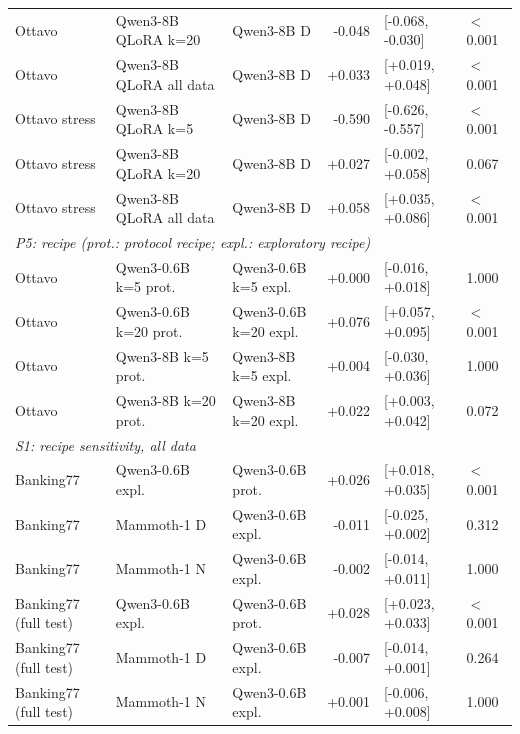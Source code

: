 \begin{tabular}{lllrll}
Ottavo & Qwen3-8B QLoRA k=20 & Qwen3-8B D & -0.048 & [-0.068, -0.030] & $<$0.001 \\
Ottavo & Qwen3-8B QLoRA all data & Qwen3-8B D & +0.033 & [+0.019, +0.048] & $<$0.001 \\
Ottavo stress & Qwen3-8B QLoRA k=5 & Qwen3-8B D & -0.590 & [-0.626, -0.557] & $<$0.001 \\
Ottavo stress & Qwen3-8B QLoRA k=20 & Qwen3-8B D & +0.027 & [-0.002, +0.058] & 0.067 \\
Ottavo stress & Qwen3-8B QLoRA all data & Qwen3-8B D & +0.058 & [+0.035, +0.086] & $<$0.001 \\
\midrule
\multicolumn{6}{l}{\textit{P5: recipe (prot.: protocol recipe; expl.: exploratory recipe)}} \\
Ottavo & Qwen3-0.6B k=5 prot. & Qwen3-0.6B k=5 expl. & +0.000 & [-0.016, +0.018] & 1.000 \\
Ottavo & Qwen3-0.6B k=20 prot. & Qwen3-0.6B k=20 expl. & +0.076 & [+0.057, +0.095] & $<$0.001 \\
Ottavo & Qwen3-8B k=5 prot. & Qwen3-8B k=5 expl. & +0.004 & [-0.030, +0.036] & 1.000 \\
Ottavo & Qwen3-8B k=20 prot. & Qwen3-8B k=20 expl. & +0.022 & [+0.003, +0.042] & 0.072 \\
\midrule
\multicolumn{6}{l}{\textit{S1: recipe sensitivity, all data}} \\
Banking77 & Qwen3-0.6B expl. & Qwen3-0.6B prot. & +0.026 & [+0.018, +0.035] & $<$0.001 \\
Banking77 & Mammoth-1 D & Qwen3-0.6B expl. & -0.011 & [-0.025, +0.002] & 0.312 \\
Banking77 & Mammoth-1 N & Qwen3-0.6B expl. & -0.002 & [-0.014, +0.011] & 1.000 \\
Banking77 (full test) & Qwen3-0.6B expl. & Qwen3-0.6B prot. & +0.028 & [+0.023, +0.033] & $<$0.001 \\
Banking77 (full test) & Mammoth-1 D & Qwen3-0.6B expl. & -0.007 & [-0.014, +0.001] & 0.264 \\
Banking77 (full test) & Mammoth-1 N & Qwen3-0.6B expl. & +0.001 & [-0.006, +0.008] & 1.000 \\
\bottomrule
\end{tabular}